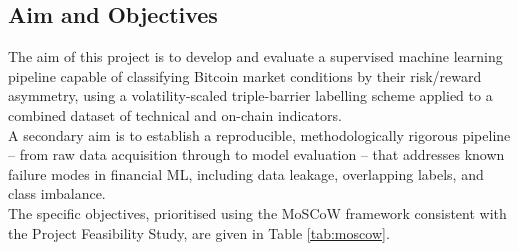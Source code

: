 \subsection{Aim and Objectives}
The aim of this project is to develop and evaluate a supervised machine learning pipeline capable of classifying Bitcoin market conditions by their risk/reward asymmetry, using a volatility-scaled triple-barrier labelling scheme applied to a combined dataset of technical and on-chain indicators.\\
A secondary aim is to establish a reproducible, methodologically rigorous pipeline -- from raw data acquisition through to model evaluation -- that addresses known failure modes in financial ML, including data leakage, overlapping labels, and class imbalance.\\
The specific objectives, prioritised using the MoSCoW framework \cite{projectmanagementinstituteBusinessAnalysisPractitioners2024} consistent with the Project Feasibility Study, are given in Table \ref{tab:moscow}.
